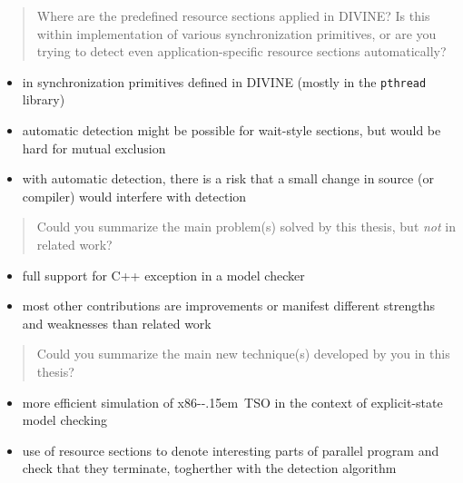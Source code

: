 \documentclass[aspectratio=169, fi]{paradise-slide}
\newcommand{\xtso}{\mbox{x86-\kern-.15em TSO}\xspace}
\newcommand{\rquote}[1]{\begin{quote}#1\end{quote}\bigskip\setlength{\leftmargini}{1em}}
\begin{document}
\begin{frame}[noframenumbering]{\qtitle}
  \rquote{Where are the predefined resource sections applied in DIVINE? Is this within
    implementation of various synchronization primitives, or are you trying to detect even
    application-specific resource sections automatically?}

  \begin{itemize}
    \item in synchronization primitives defined in DIVINE (mostly in the \texttt{pthread} library)
    \item automatic detection might be possible for wait-style sections, but would be hard for
      mutual exclusion
    \item with automatic detection, there is a risk that a small change in source (or compiler)
      would interfere with detection
  \end{itemize}
\end{frame}

\def\rname{prof. Jaco van de Pol}

\begin{frame}[noframenumbering]{\qtitle}
  \rquote{Could you summarize the main problem(s) solved by this thesis, but \emph{not} in related
    work?}
  \begin{itemize}
    \item full support for C++ exception in a model checker
    \item most other contributions are improvements or manifest different strengths and weaknesses
      than related work
  \end{itemize}
\end{frame}

\begin{frame}[noframenumbering]{\qtitle}
  \rquote{Could you summarize the main new technique(s) developed by you in this thesis?}
  \begin{itemize}
    \item more efficient simulation of \xtso in the context of explicit-state model checking
    \medskip
    \item use of resource sections to denote interesting parts of parallel program and check that
      they terminate, togherther with the detection algorithm
  \end{itemize}
\end{frame}
\end{document}
